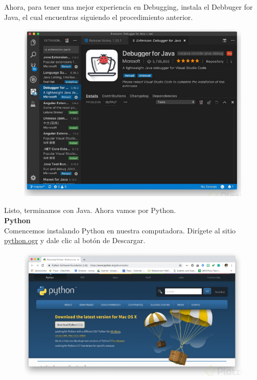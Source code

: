\documentclass{article}
\begin{document}
Ahora, para tener una mejor experiencia en Debugging, instala el Debbuger for
Java, el cual encuentras siguiendo el procedimiento anterior.

\begin{figure}[h!]
  \centering
  \includegraphics[scale=0.75]{./Pictures/025.png}
\end{figure}

Listo, terminamos con Java. Ahora vamos por Python.\\

\newpage
\textbf{Python}\\
Comencemos instalando Python en nuestra computadora. Dirígete al sitio
\href{https://www.python.org/}{python.ogr}  y dale clic al botón de Descargar.

\begin{figure}[h!]
  \centering
  \includegraphics[scale=0.75]{./Pictures/026_python.png}
\end{figure}
\end{document}
